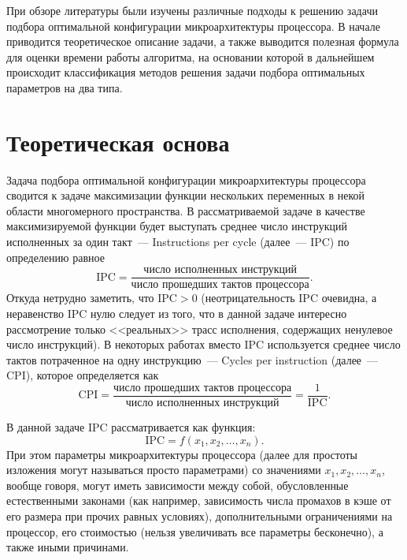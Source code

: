 При обзоре литературы были изучены различные подходы к решению задачи подбора оптимальной конфигурации микроархитектуры процессора. В начале приводится теоретическое описание задачи, а также выводится полезная формула для оценки времени работы алгоритма, на основании которой в дальнейшем происходит классификация методов решения задачи подбора оптимальных параметров на два типа.


\section{Теоретическая основа}\label{sec:theor_base}

Задача подбора оптимальной конфигурации микроархитектуры процессора сводится к задаче максимизации функции нескольких переменных в некой области многомерного пространства. В рассматриваемой задаче в качестве максимизируемой функции будет выступать среднее число инструкций исполненных за один такт~--- Instructions per cycle (далее~--- IPC) по определению равное
\begin{equation}\label{eq:IPC}
  \text{IPC} = \dfrac{\text{число исполненных инструкций}}{\text{число прошедших тактов процессора}}.
\end{equation}
Откуда нетрудно заметить, что $\text{IPC} > 0$ (неотрицательность IPC очевидна, а неравенство IPC нулю следует из того, что в данной задаче интересно рассмотрение только <<реальных>> трасс исполнения, содержащих ненулевое число инструкций). В некоторых работах вместо IPC используется среднее число тактов потраченное на одну инструкцию~--- Cycles per instruction (далее~--- CPI), которое определяется как
\begin{equation}\label{eq:CPI}
  \text{CPI} = \dfrac{\text{число прошедших тактов процессора}}{\text{число исполненных инструкций}} = \dfrac{1}{\text{IPC}}.
\end{equation}

В данной задаче IPC рассматривается как функция:
\[
  \text{IPC} = f\left(x_1, x_2, \dots, x_n\right).
\]
При этом параметры микроархитектуры процессора (далее для простоты изложения могут называться просто параметрами) со значениями $x_1,x_2,\dots,x_n$, вообще говоря, могут иметь зависимости между собой, обусловленные естественными законами (как например, зависимость числа промахов в кэше от его размера при прочих равных условиях), дополнительными ограничениями на процессор, его стоимостью (нельзя увеличивать все параметры бесконечно), а также иными причинами.


